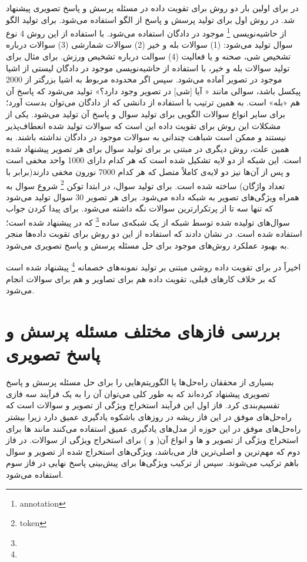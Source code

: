   در
  \cite{kafle2017data}
 برای اولین بار دو روش برای تقویت داده در مسئله پرسش و پاسخ تصویری پیشنهاد شد.  در روش اول برای تولید پرسش و پاسخ از الگو استفاده‌ می‌شود. برای تولید الگو از حاشیه‌نویسی 
 \footnote{annotation}
 موجود در ‌دادگان استفاده‌ می‌شود. با استفاده از این روش 4 نوع سوال تولید می‌شود: (1) سوالات بله و خیر (2) سوالات شمارشی (3) سوالات درباره تشخیص شی، صحنه و یا فعالیت (4) سوالت درباره تشخیص ورزش. برای مثال برای تولید سوالات بله و خیر، با استفاده از حاشیه‌نویسی موجود در دادگان لیستی از اشیا موجود در تصویر آماده می‌شود. سپس اگر محدوده مربوط به اشیا بزرگتر از 2000 پیکسل باشد، سوالی مانند « آیا [شی] در تصویر وجود دارد؟» تولید می‌شود که پاسخ آن هم «بله» است. به همین ترتیب با استفاده از دانشی که از ‌دادگان می‌توان بدست آورد؛ برای سایر انواع سوالات الگویی برای تولید سوال و پاسخ آن تولید می‌شود. یکی از مشکلات این روش برای تقویت داده این است که سوالات تولید شده انعطاف‌‌پذیر نیستند و ممکن است شباهت چندانی به سوالات موجود در ‌دادگان نداشته باشند. به همین علت، روش دیگری در 
 \cite{kafle2017data}
 مبتنی بر 
 برای تولید سوال برای هر تصویر پیشنهاد شده است. این شبکه از دو لایه 
 تشکیل شده است که هر کدام دارای 1000 واحد مخفی است و پس از آن‌ها نیز دو لایه‌ی کاملاً متصل که هر کدام 7000 نورون مخفی دارند(برابر با تعداد واژگان) ساخته شده است. برای تولید سوال، در ابتدا توکن 
 \footnote{token}
 شروع سوال به همراه ویژگی‌های تصویر به شبکه داده‌ می‌شود. برای هر تصویر 30 سوال تولید می‌شود که تنها سه تا از پرتکرارترین سوالات  نگه داشته می‌شود. برای پیدا کردن جواب سوال‌های تولیده شده توسط شبکه 
 از یک شبکه‌ی ساده
 \footnote{}
 که در 
 \cite{kafle2016answer}
  پیشنهاد شده است؛ استفاده شده است. در 
 \cite{kafle2017data}
  نشان دادند که استفاده از این دو روش برای تقوبت داده‌ها منجر به بهبود عملکرد روش‌های موجود برای حل مسئله پرسش و پاسخ تصویری می‌شود. 
  
  اخیراً در
 \cite{tang2020semantic}
 برای تقویت داده روشی مبتنی بر تولید نمونه‌های خصمانه
 \footnote{}
 پیشنهاد شده است که بر خلاف کارهای قبلی، تقویت داده هم برای تصاویر و هم برای سوالات انجام می‌شود.
 
 
\section{بررسی فازهای مختلف مسئله پرسش و پاسخ تصویری}
بسیاری از محققان راه‌حل‌ها یا الگوریتم‌هایی را برای حل مسئله پرسش و پاسخ تصویری پیشنهاد‌ کرده‌اند که به طور کلی می‌توان آن را به یک فرآیند سه فازی تقسیم‌بندی کرد. فاز اول این فرآیند استخراج ویژگی از تصویر و سوالات است که راه‌حل‌های موفق در این فاز ریشه در روزهای باشکوه یادگیری عمیق دارد زیرا بیشتر راه‌حل‌های موفق در این حوزه از مدل‌های یادگیری عمیق استفاده می‌کنند مانند 
 ها برای استخراج ویژگی از  تصویر و 
  ها و انواع آن(
  و
  ) برای استخراج ویژگی از سوالات. در فاز دوم که مهم‌ترین و اصلی‌ترین فاز می‌باشد، ویژگی‌های استخراج شده از تصویر و سوال باهم ترکیب می‌شوند. سپس از ترکیب ویژگی‌ها برای پیش‌بینی پاسخ نهایی در فاز سوم استفاده می‌شود.
